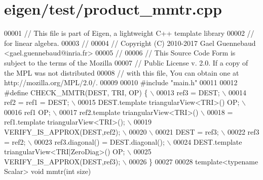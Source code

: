 \hypertarget{eigen_2test_2product__mmtr_8cpp_source}{}\section{eigen/test/product\+\_\+mmtr.cpp}
\label{eigen_2test_2product__mmtr_8cpp_source}

\begin{DoxyCode}
00001 \textcolor{comment}{// This file is part of Eigen, a lightweight C++ template library}
00002 \textcolor{comment}{// for linear algebra.}
00003 \textcolor{comment}{//}
00004 \textcolor{comment}{// Copyright (C) 2010-2017 Gael Guennebaud <gael.guennebaud@inria.fr>}
00005 \textcolor{comment}{//}
00006 \textcolor{comment}{// This Source Code Form is subject to the terms of the Mozilla}
00007 \textcolor{comment}{// Public License v. 2.0. If a copy of the MPL was not distributed}
00008 \textcolor{comment}{// with this file, You can obtain one at http://mozilla.org/MPL/2.0/.}
00009 
00010 \textcolor{preprocessor}{#include "main.h"}
00011 
00012 \textcolor{preprocessor}{#define CHECK\_MMTR(DEST, TRI, OP) \{                   \(\backslash\)}
00013 \textcolor{preprocessor}{    ref3 = DEST;                                      \(\backslash\)}
00014 \textcolor{preprocessor}{    ref2 = ref1 = DEST;                               \(\backslash\)}
00015 \textcolor{preprocessor}{    DEST.template triangularView<TRI>() OP;           \(\backslash\)}
00016 \textcolor{preprocessor}{    ref1 OP;                                          \(\backslash\)}
00017 \textcolor{preprocessor}{    ref2.template triangularView<TRI>()               \(\backslash\)}
00018 \textcolor{preprocessor}{      = ref1.template triangularView<TRI>();          \(\backslash\)}
00019 \textcolor{preprocessor}{    VERIFY\_IS\_APPROX(DEST,ref2);                      \(\backslash\)}
00020 \textcolor{preprocessor}{    \(\backslash\)}
00021 \textcolor{preprocessor}{    DEST = ref3;                                      \(\backslash\)}
00022 \textcolor{preprocessor}{    ref3 = ref2;                                      \(\backslash\)}
00023 \textcolor{preprocessor}{    ref3.diagonal() = DEST.diagonal();                \(\backslash\)}
00024 \textcolor{preprocessor}{    DEST.template triangularView<TRI|ZeroDiag>() OP;  \(\backslash\)}
00025 \textcolor{preprocessor}{    VERIFY\_IS\_APPROX(DEST,ref3);                      \(\backslash\)}
00026 \textcolor{preprocessor}{  \}}
00027 
00028 \textcolor{keyword}{template}<\textcolor{keyword}{typename} Scalar> \textcolor{keywordtype}{void} mmtr(\textcolor{keywordtype}{int} size)

\end{DoxyCode}
